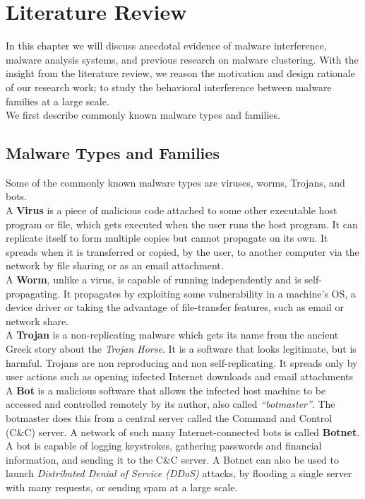 \chapter{Literature Review}\label{chapter:literature_review}
In this chapter we will discuss anecdotal evidence of malware interference, malware analysis systems, and previous research on malware clustering.
With the insight from the literature review, we reason the motivation and design rationale of our research work; to study the behavioral interference between malware families at a large scale.\\
We first describe commonly known malware types and families.

\section{Malware Types and Families}
\label{sec:Malware Types and Families}
Some of the commonly known malware types are viruses, worms, Trojans, and bots.\\
A \textbf{Virus} is a piece of malicious code attached to some other executable host program or file, which gets executed when the user runs the host program.
It can replicate itself to form multiple copies but cannot propagate on its own.
It spreads when it is transferred or copied, by the user, to another computer via the network by file sharing or as an email attachment.\\
A \textbf{Worm}, unlike a virus, is capable of running independently and is self-propagating.
It propagates by exploiting some vulnerability in a machine's OS, a device driver or taking the advantage of file-transfer features, such as email or network share.\\
A \textbf{Trojan} is a non-replicating malware which gets its name from the ancient Greek story about the \textit{Trojan Horse}.
It is a software that looks legitimate, but is harmful.
Trojans are non reproducing and non self-replicating.
It spreads only by user actions such as opening infected Internet downloads and email attachments~\cite[]{ciscodif} \\
A \textbf{Bot} is a malicious software that allows the infected host machine to be accessed and controlled remotely by its author, also called \emph{``botmaster''}.
The botmaster does this from a central server called the Command and Control (C\&C) server.
A network of such many Internet-connected bots is called \textbf{Botnet}.
A bot is capable of logging keystrokes, gathering passwords and financial information, and sending it to the C\&C server.
A Botnet can also be used to launch \emph{Distributed Denial of Service (DDoS)} attacks, by flooding a single server with many requests, or sending spam at a large scale.\\

